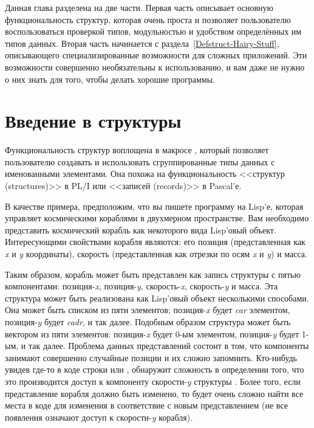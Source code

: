 Данная глава разделена на две части. Первая часть описывает основную
функциональность структур, которая очень проста и позволяет пользователю
воспользоваться проверкой типов, модульностью и удобством определённых им типов
данных. Вторая часть начинается с раздела~\ref{Defstruct-Hairy-Stuff},
описывающего специализированные возможности для сложных приложений. Эти
возможности совершенно необязательны к использованию, и вам даже не нужно о них
знать для того, чтобы делать хорошие программы.

\section{Введение в структуры}
\label{DEFSTRUCT-INTRO-SECTION}

Функциональность структур воплощена в макросе , который позволяет
пользователю создавать и использовать сгруппированные типы данных с именованными
элементами. Она похожа на функциональность <<структур (structures)>> в {PL/I}
или <<записей (records)>> в Pascal'е.

В качестве примера, предположим, что вы пишете программу на Lisp'е, которая
управляет космическими кораблями в двухмерном пространстве.
Вам необходимо представить космический корабль как некоторого
вида Lisp'овый объект. Интересующими свойствами корабля являются: его
позиция (представленная как \emph{x} и \emph{y} координаты), скорость
(представленная как отрезки по осям \emph{x} и \emph{y}) и масса.

Таким образом, корабль может быть представлен как запись структуры с пятью
компонентами: позиция-\emph{x}, позиция-\emph{y}, скорость-\emph{x},
скорость-\emph{y} и масса.
Эта структура может быть реализована как Lisp'овый объект несколькими способами.
Она может быть списком из пяти элементов; позиция-\emph{x} будет \emph{car}
элементом, позиция-\emph{y} будет \emph{cadr}, и так далее. Подобным образом
структура может быть вектором из пяти элементов: позиция-\emph{x} будет 0-ым
элементом, позиция-\emph{y} будет 1-ым, и так далее. Проблема данных
представлений состоит в том, что компоненты занимают совершенно случайные
позиции и их сложно запомнить. Кто-нибудь увидев где-то в коде
строки  или , обнаружит сложность в
определении того, что это производится доступ к компоненту скорости-\emph{y}
структуры . Более того, если представление корабля должно быть
изменено, то будет очень сложно найти все места в коде для изменения в
соответствие с новым представлением (не все появления  означают
доступ к скорости-\emph{y} корабля). 

